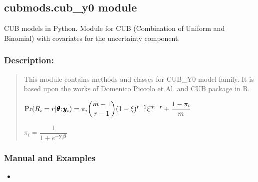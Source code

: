 \documentclass[letterpaper,10pt,english]{sphinxmanual}
\begin{document}
\subsection{cubmods.cub\_y0 module}
\label{\detokenize{cubmods:module-cubmods.cub_y0}}\label{\detokenize{cubmods:cubmods-cub-y0-module}}\label{\detokenize{cubmods:cuby0-module}}
\sphinxAtStartPar
CUB models in Python.
Module for CUB (Combination of Uniform
and Binomial) with covariates for the uncertainty component.


\subsubsection{Description:}
\label{\detokenize{cubmods:id118}}\begin{quote}

\sphinxAtStartPar
This module contains methods and classes
for CUB\_Y0 model family.
It is based upon the works of Domenico
Piccolo et Al. and CUB package in R.

\sphinxAtStartPar
\(\Pr(R_i=r|\pmb{\theta} ; \pmb y_i) = \pi_i \dbinom{m-1}{r-1}(1-\xi)^{r-1}\xi^{m-r}+\dfrac{1-\pi_i}{m}\)

\sphinxAtStartPar
\(\pi_i = \dfrac{1}{1+e^{-\pmb y_i \pmb\beta}}\)
\end{quote}


\subsubsection{Manual and Examples}
\label{\detokenize{cubmods:id119}}\begin{itemize}
\item {} 
\sphinxAtStartPar
{}

\end{itemize}
\end{document}
